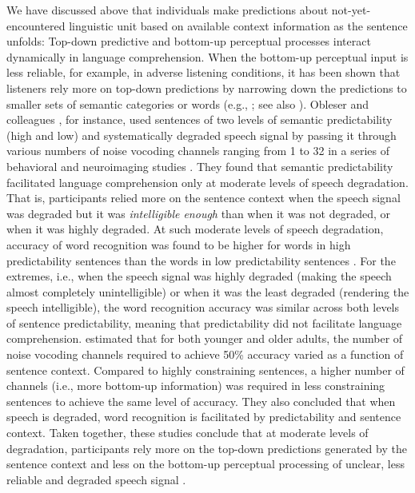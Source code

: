 \documentclass[a4paper, nobind]{templates/ociamthesis}
\begin{document}
We have discussed above that individuals make predictions about not-yet-encountered linguistic unit based on available context information as the sentence unfolds:
Top-down predictive and bottom-up perceptual processes interact dynamically in language comprehension.
When the bottom-up perceptual input is less reliable, for example, in adverse listening conditions, it has been shown that listeners rely more on top-down predictions by narrowing down the predictions to smaller sets of semantic categories or words (e.g., \textcite{Strauss2013}; see also \textcite{Corps2020}).
Obleser and colleagues \autocite{Obleser2007,Obleser2010,Obleser2011}, for instance, used sentences of two levels of semantic predictability (high and low) and systematically degraded speech signal by passing it through various numbers of noise vocoding channels ranging from 1 to 32 in a series of behavioral and neuroimaging studies \autocite[see also][]{Hunter2018}.
They found that semantic predictability facilitated language comprehension only at moderate levels of speech degradation.
That is, participants relied more on the sentence context when the speech signal was degraded but it was \emph{intelligible enough} than when it was not degraded, or when it was highly degraded.
At such moderate levels of speech degradation, accuracy of word recognition was found to be higher for words in high predictability sentences than the words in low predictability sentences \autocite{Obleser2010}.
For the extremes, i.e., when the speech signal was highly degraded (making the speech almost completely unintelligible) or when it was the least degraded (rendering the speech intelligible),
the word recognition accuracy was similar across both levels of sentence predictability, meaning that predictability did not facilitate language comprehension.
\textcite{Sheldon2008b} estimated that for both younger and older adults, the number of noise vocoding channels required to achieve 50\% accuracy varied as a function of sentence context.
Compared to highly constraining sentences, a higher number of channels (i.e., more bottom-up information) was required in less constraining sentences to achieve the same level of accuracy.
They also concluded that when speech is degraded, word recognition is facilitated by predictability and sentence context.
Taken together, these studies conclude that at moderate levels of degradation, participants rely more on the top-down predictions generated by the sentence context and less on the bottom-up perceptual processing of unclear, less reliable and degraded speech signal \autocite{Obleser2014}.
\end{document}
